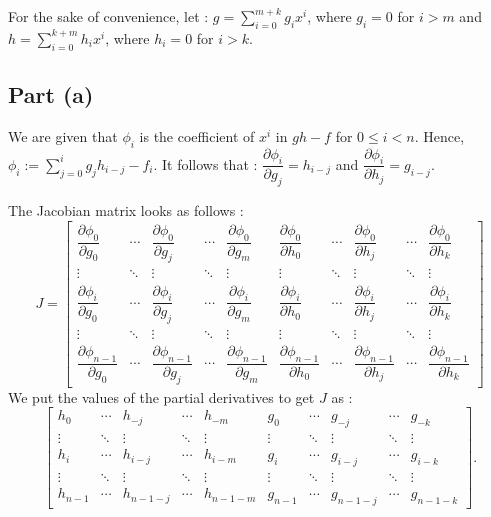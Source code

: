 \begin{thisnote1}
For the sake of convenience, let : $g=\sum_{i=0}^{m+k} g_i x^i$, where $g_i=0$ for $i>m$ and $h=\sum_{i=0}^{k+m} h_i x^i$, where $h_i = 0$ for $i>k$.
\end{thisnote1}

\subsection{Part (a)}

We are given that $\phi_i$ is the coefficient of $x^i$ in $gh-f$ for $0\leq i<n$. Hence, $\phi_i :=\sum_{j=0}^i g_j h_{i-j} - f_i$. It follows that : $\dfrac{\partial \phi_i}{\partial g_j} = h_{i-j}$ and $\dfrac{\partial \phi_i}{\partial h_j} = g_{i-j}$.

The Jacobian matrix looks as follows :
\[J = \begin{bmatrix}
        \dfrac{\partial \phi_0}{\partial g_0} & \cdots &\dfrac{\partial \phi_0}{\partial g_j} & \cdots & \dfrac{\partial \phi_0}{\partial g_m} & \dfrac{\partial \phi_0}{\partial h_0} & \cdots &\dfrac{\partial \phi_0}{\partial h_j} &\cdots&\dfrac{\partial \phi_0}{\partial h_k} \\ 


\vdots & \ddots &\vdots & \ddots& \vdots & \vdots & \ddots &\vdots & \ddots& \vdots \\

\dfrac{\partial \phi_i}{\partial g_0} & \cdots &\dfrac{\partial \phi_i}{\partial g_j} & \cdots & \dfrac{\partial \phi_i}{\partial g_m} & \dfrac{\partial \phi_i}{\partial h_0} & \cdots &\dfrac{\partial \phi_i}{\partial h_j} &\cdots&\dfrac{\partial \phi_i}{\partial h_k} \\ 

\vdots & \ddots &\vdots & \ddots& \vdots & \vdots & \ddots &\vdots & \ddots& \vdots \\

\dfrac{\partial \phi_{n-1}}{\partial g_0} & \cdots &\dfrac{\partial \phi_{n-1}}{\partial g_j} & \cdots & \dfrac{\partial \phi_{n-1}}{\partial g_m} & \dfrac{\partial \phi_{n-1}}{\partial h_0} & \cdots &\dfrac{\partial \phi_{n-1}}{\partial h_j} &\cdots&\dfrac{\partial \phi_{n-1}}{\partial h_k} 
\end{bmatrix}\]
We put the values of the partial derivatives to get $J$ as : 
\[\begin{bmatrix}h_0 & \cdots & h_{-j} & \cdots & h_{-m} & g_0 & \cdots & g_{-j} & \cdots & g_{-k} \\
\vdots & \ddots &\vdots & \ddots& \vdots & \vdots & \ddots &\vdots & \ddots& \vdots \\
h_i &\cdots & h_{i-j} & \cdots & h_{i-m} & g_{i} & \cdots & g_{i-j} & \cdots & g_{i-k} \\
\vdots & \ddots &\vdots & \ddots& \vdots & \vdots & \ddots &\vdots & \ddots& \vdots \\
h_{n-1} & \cdots & h_{n-1-j} & \cdots & h_{n-1-m} & g_{n-1} & \cdots & g_{n-1-j} & \cdots & g_{n-1-k}
\end{bmatrix}.\]
